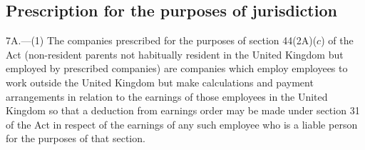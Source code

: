 \documentclass[12pt,a4paper]{article}
\begin{document}
%
%
%
%

\subsection[7A. Prescription for the purposes of jurisdiction]{Prescription for the purposes of jurisdiction}

7A.---(1)  The companies prescribed for the purposes of section 44(2A)($c$)  of the Act (non-resident parents not habitually resident in the United Kingdom but employed by prescribed companies) are companies which employ employees to work outside the United Kingdom but make calculations and payment arrangements in relation to the earnings of those employees in the United Kingdom so that a deduction from earnings order may be made under section 31 of the Act in respect of the earnings of any such employee who is a liable person for the purposes of that section.
\end{document}
